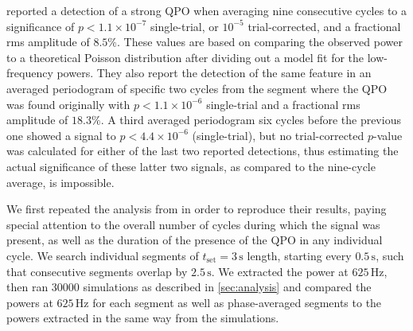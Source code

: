 \documentclass{emulateapj}
\begin{document}
%
%

\citealt{Strohmayer06} reported a detection of a strong QPO when averaging nine consecutive cycles to a significance of $p < 1.1 \times 10^{-7}$ single-trial, or $10^{-5}$ trial-corrected, and a fractional rms amplitude of $8.5\%$. These values are based on comparing the observed power to a theoretical Poisson distribution after dividing out a model fit for the low-frequency powers. They also report the detection of the same feature in an averaged periodogram of specific two cycles from the segment where the QPO was found originally with $p < 1.1 \times 10^{-6}$ single-trial and a fractional rms amplitude of $18.3\%$. A third averaged periodogram six cycles before the previous one showed a signal to $p < 4.4 \times 10^{-6}$ (single-trial), but no trial-corrected $p$-value was calculated for either of the last two reported detections, thus estimating the actual significance of these latter two signals, as compared to the nine-cycle average, is impossible.

We first repeated the analysis from \citealt{Strohmayer06} in order to reproduce their results, paying special attention to the overall number of cycles during which the signal was present, as well as the duration of the presence of the QPO in any individual cycle.
We search individual segments of $t_{\mathrm{set}} = 3 \, \mathrm{s}$ length, starting every $0.5 \, \mathrm{s}$, such that consecutive segments overlap by $2.5 \, \mathrm{s}$. We extracted the power at $625 \, \mathrm{Hz}$, then ran 30000 simulations as described in \ref{sec:analysis} and compared the powers at $625 \, \mathrm{Hz}$ for each segment as well as phase-averaged segments to the powers extracted in the same way from the simulations.
\end{document}
